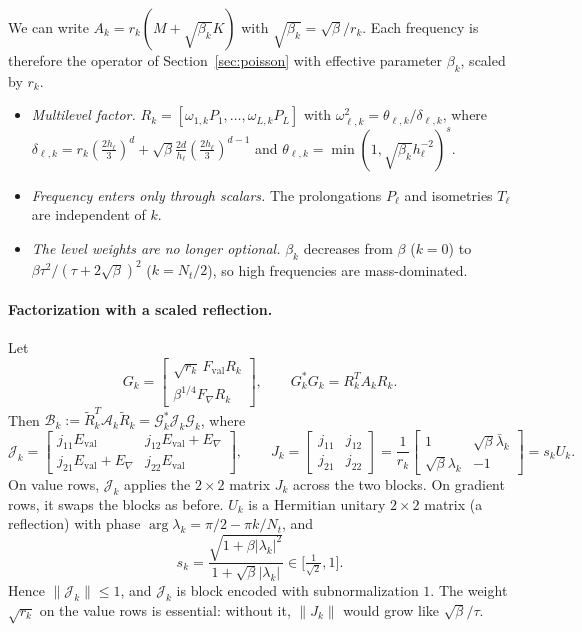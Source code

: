 \documentclass[11pt,a4paper]{article}
\newcommand{\A}{\mathcal{A}}
\newcommand{\B}{\mathcal{B}}
\newcommand{\G}{\mathcal{G}}
\newcommand{\J}{\mathcal{J}}
\newcommand{\Rt}{\widetilde R}
\theoremstyle{remark}
\begin{document}
We can write $A_k=r_k(M+\sqrt{\beta_k}K)$ with $\sqrt{\beta_k}=\sqrt\beta/r_k$. Each
frequency is therefore the operator of Section~\ref{sec:poisson} with
effective parameter $\beta_k$, scaled by $r_k$.
\begin{itemize}
\item \emph{Multilevel factor.} $R_k=[\omega_{1,k}P_1,\dots,\omega_{L,k}P_L]$ with
  $\omega_{\ell,k}^2=\theta_{\ell,k}/\delta_{\ell,k}$, where
  $\delta_{\ell,k}=r_k(\frac{2h_\ell}3)^d+\sqrt\beta\frac{2d}{h_\ell}(\frac{2h_\ell}3)^{d-1}$ and
  $\theta_{\ell,k}=\min(1,\sqrt{\beta_k}h_\ell^{-2})^s$.
\item \emph{Frequency enters only through scalars.} The prolongations $P_\ell$
  and isometries $T_\ell$ are independent of $k$.
\item \emph{The level weights are no longer optional.} $\beta_k$ decreases from
  $\beta$ ($k=0$) to $\beta\tau^2/(\tau+2\sqrt\beta)^2$ ($k=N_t/2$), so high frequencies
  are mass-dominated.
\end{itemize}

\paragraph{Factorization with a scaled reflection.} Let
\[
G_k=\begin{bmatrix}\sqrt{r_k}\,F_{\mathrm{val}}R_k\\ \beta^{1/4}F_\nabla R_k\end{bmatrix},\qquad
G_k^*G_k=R_k^TA_kR_k .
\]
Then $\B_k:=\Rt_k^T\A_k\Rt_k=\G_k^*\J_k\G_k$, where
\begin{equation}\label{eq:Jk}
\J_k=\begin{bmatrix}j_{11}E_{\mathrm{val}} & j_{12}E_{\mathrm{val}}+E_\nabla\\ j_{21}E_{\mathrm{val}}+E_\nabla & j_{22}E_{\mathrm{val}}\end{bmatrix},\qquad
J_k=\begin{bmatrix}j_{11}&j_{12}\\ j_{21}&j_{22}\end{bmatrix}
=\frac1{r_k}\begin{bmatrix}1&\sqrt\beta\bar\lambda_k\\ \sqrt\beta\lambda_k&-1\end{bmatrix}=s_kU_k .
\end{equation}
On value rows, $\J_k$ applies the $2\times2$ matrix $J_k$ across the two blocks. On
gradient rows, it swaps the blocks as before. $U_k$ is a Hermitian unitary
$2\times2$ matrix (a reflection) with phase $\arg\lambda_k=\pi/2-\pi k/N_t$, and
\[
s_k=\frac{\sqrt{1+\beta|\lambda_k|^2}}{1+\sqrt\beta|\lambda_k|}\in\big[\tfrac1{\sqrt2},1\big].
\]
Hence $\|\J_k\|\le1$, and $\J_k$ is block encoded with subnormalization $1$.
The weight $\sqrt{r_k}$ on the value rows is essential: without it,
$\|J_k\|$ would grow like $\sqrt\beta/\tau$.
\end{document}
